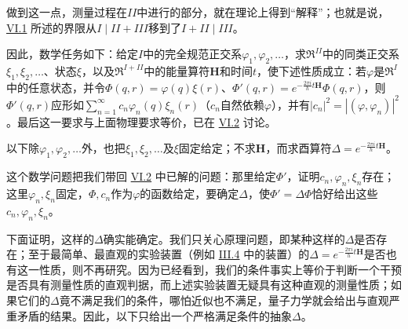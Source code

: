 \documentclass[fontsize=13pt,twoside,openany,headings=normal,parskip=false,bookmarkpackage=false,DIV=calc]{scrbook}
\begin{document}
做到这一点，测量过程在$II$中进行的部分，就在理论上得到“解释”；也就是说，\hyperref[sec:VI.1]{VI.1} 所述的界限从$I\mid II+III$移到了$I+II\mid III$。

因此，数学任务如下：给定$I$中的完全规范正交系$\varphi_1,\allowbreak \varphi_2,\allowbreak \ldots$，求$\mathfrak R^{II}$中的同类正交系$\xi_1,\allowbreak \xi_2,\allowbreak \ldots$、状态$\xi$，以及$\mathfrak R^{I+II}$中的能量算符$\boldsymbol H$和时间$t$，使下述性质成立：若$\varphi$是$\mathfrak R^I$中的任意状态，并令$\Phi(q,\allowbreak r)=\varphi(q)\xi(r)$、$\Phi'(q,\allowbreak r)=e^{-\frac{2\pi i}{h}t\boldsymbol H}\Phi(q,\allowbreak r)$，则$\Phi'(q,\allowbreak r)$应形如$\sum_{n=1}^{\infty}c_n\varphi_n(q)\xi_n(r)$（$c_n$自然依赖$\varphi$），并有$|c_n|^2=|(\varphi,\allowbreak \varphi_n)|^2$。\hypertarget{origpage-235}{}\label{origpage-235}最后这一要求与上面物理要求等价，已在 \hyperref[sec:VI.2]{VI.2} 讨论。

以下除$\varphi_1,\allowbreak \varphi_2,\allowbreak \ldots$外，也把$\xi_1,\allowbreak \xi_2,\allowbreak \ldots$及$\xi$固定给定；不求$\boldsymbol H$，而求酉算符$\Delta=e^{-\frac{2\pi i}{h}t\boldsymbol H}$。

这个数学问题把我们带回 \hyperref[sec:VI.2]{VI.2} 中已解的问题：那里给定$\Phi'$，证明$c_n,\allowbreak \varphi_n,\allowbreak \xi_n$存在；这里$\varphi_n,\allowbreak \xi_n$固定，$\Phi,\allowbreak c_n$作为$\varphi$的函数给定，要确定$\Delta$，使$\Phi'=\Delta\Phi$恰好给出这些$c_n,\allowbreak \varphi_n,\allowbreak \xi_n$。

下面证明，这样的$\Delta$确实能确定。我们只关心原理问题，即某种这样的$\Delta$是否存在；至于最简单、最直观的实验装置（例如 \hyperref[sec:III.4]{III.4} 中的装置）的$\Delta=e^{-\frac{2\pi i}{h}t\boldsymbol H}$是否也有这一性质，则不再研究。因为已经看到，我们的条件事实上等价于判断一个干预是否具有测量性质的直观判据，而上述实验装置无疑具有这种直观的测量性质；如果它们的$\Delta$竟不满足我们的条件，哪怕近似也不满足，量子力学就会给出与直观严重矛盾的结果。因此，以下只给出一个严格满足条件的抽象$\Delta$。
\end{document}
